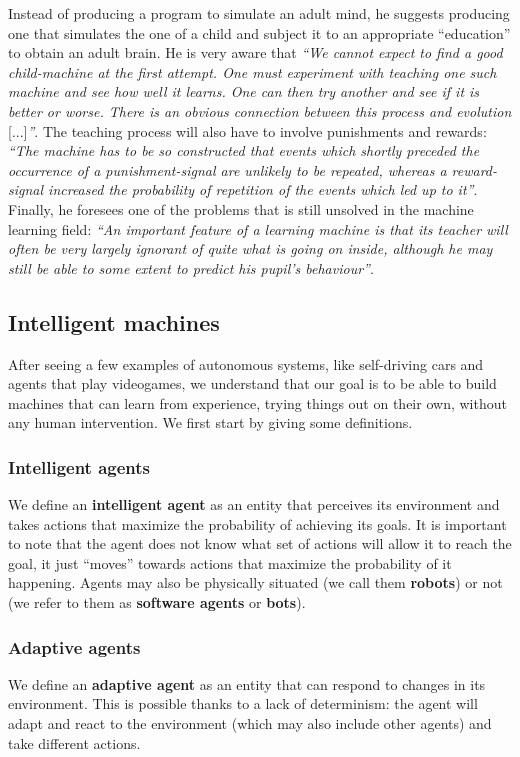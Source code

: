 Instead of producing a program to simulate an adult mind, he suggests producing one that simulates the one of a child and subject it to an appropriate ``education'' to obtain an adult brain. He is very aware that \textit{``We cannot expect to find a good child-machine at the first attempt. One must experiment with teaching one such machine and see how well it learns. One can then try another and see if it is better or worse. There is an obvious connection between this process and evolution} [...]\textit{''}. The teaching process will also have to involve punishments and rewards: \textit{``The machine has to be so constructed that events which shortly preceded the occurrence of a punishment-signal are unlikely to be repeated, whereas a reward-signal increased the probability of
repetition of the events which led up to it''}. Finally, he foresees one of the problems that is still unsolved in the machine learning field: \textit{``An important feature of a learning machine is that its teacher will often be very largely ignorant of quite what is going on inside, although he may
still be able to some extent to predict his pupil’s behaviour''}.

\subsection{Intelligent machines}
After seeing a few examples of autonomous systems, like self-driving cars and agents that play videogames, we understand that our goal is to be able to build machines that can learn from experience, trying things out on their own, without any human intervention. We first start by giving some definitions.

\subsubsection{Intelligent agents}
We define an \textbf{intelligent agent} as an entity that perceives its environment and takes actions that maximize the probability of achieving its goals. It is important to note that the agent does not know what set of actions will allow it to reach the goal, it just ``moves'' towards actions that maximize the probability of it happening. Agents may also be physically situated (we call them \textbf{robots}) or not (we refer to them as \textbf{software agents} or \textbf{bots}).

\subsubsection{Adaptive agents}
We define an \textbf{adaptive agent} as an entity that can respond to changes in its environment. This is possible thanks to a lack of determinism: the agent will adapt and react to the environment (which may also include other agents) and take different actions.

